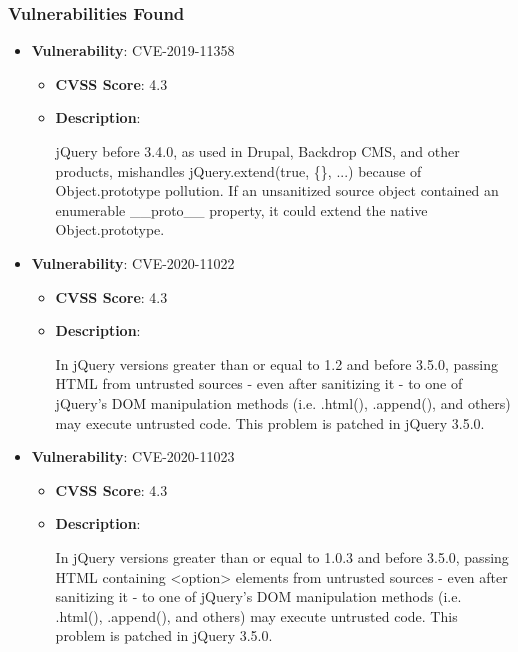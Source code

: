 \documentclass{article}
\begin{document}
\subsubsection*{Vulnerabilities Found}

\begin{itemize}
    
        \item \textbf{Vulnerability}: CVE-2019-11358
        \begin{itemize}
            \item \textbf{CVSS Score}:  4.3 
            \item \textbf{Description}:
            \parbox[t]{0.9\linewidth}{
                \ttfamily jQuery before 3.4.0, as used in Drupal, Backdrop CMS, and other products, mishandles jQuery.extend(true, \{\}, ...) because of Object.prototype pollution. If an unsanitized source object contained an enumerable \_\_proto\_\_ property, it could extend the native Object.prototype.
            }
        \end{itemize}
    
        \item \textbf{Vulnerability}: CVE-2020-11022
        \begin{itemize}
            \item \textbf{CVSS Score}:  4.3 
            \item \textbf{Description}:
            \parbox[t]{0.9\linewidth}{
                \ttfamily In jQuery versions greater than or equal to 1.2 and before 3.5.0, passing HTML from untrusted sources - even after sanitizing it - to one of jQuery's DOM manipulation methods (i.e. .html(), .append(), and others) may execute untrusted code. This problem is patched in jQuery 3.5.0.
            }
        \end{itemize}
    
        \item \textbf{Vulnerability}: CVE-2020-11023
        \begin{itemize}
            \item \textbf{CVSS Score}:  4.3 
            \item \textbf{Description}:
            \parbox[t]{0.9\linewidth}{
                \ttfamily In jQuery versions greater than or equal to 1.0.3 and before 3.5.0, passing HTML containing <option> elements from untrusted sources - even after sanitizing it - to one of jQuery's DOM manipulation methods (i.e. .html(), .append(), and others) may execute untrusted code. This problem is patched in jQuery 3.5.0.
            }
        \end{itemize}
    

\end{itemize}
\end{document}
